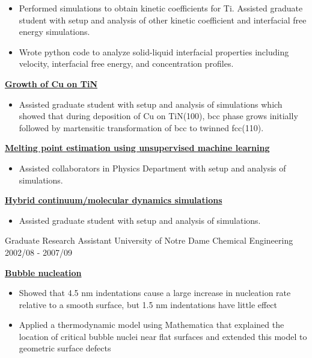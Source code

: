\begin{cventries}
{\begin{cvitems}
                \begin{itemize}
                \item {Performed simulations to obtain kinetic coefficients for Ti. Assisted graduate student with setup and analysis of other kinetic coefficient and interfacial free energy simulations.}
                \item {Wrote python code to analyze solid-liquid interfacial properties including velocity, interfacial free energy, and concentration profiles.}
                \end{itemize}
            \item {\textbf{\underline{Growth of Cu on TiN}}}
                \vspace{2pt}
                \begin{itemize}
                \item {Assisted graduate student with setup and analysis of simulations which showed that during deposition of Cu on TiN(100), bcc phase grows initially followed by martensitic transformation of bcc to twinned fcc(110).}
                \end{itemize}
            \item {\textbf{\underline{Melting point estimation using unsupervised machine learning}}}
                \vspace{2pt}
                \begin{itemize}
                \item {Assisted collaborators in Physics Department with setup and analysis of simulations.}
                \end{itemize}
            \item {\textbf{\underline{Hybrid continuum/molecular dynamics simulations}}}
                \vspace{2pt}
                \begin{itemize}
                \item {Assisted graduate student with setup and analysis of simulations.}
                \end{itemize}
        \end{cvitems}
    }

  \cventry
    {Graduate Research Assistant} %
    {University of Notre Dame} %
    {Chemical Engineering} %
    {2002/08 - 2007/09} %
    {
      \begin{cvitems} %
        \item {\textbf{\underline{Bubble nucleation}}}
            \begin{itemize}
                \item {Showed that 4.5 nm indentations cause a large increase in nucleation rate relative to a smooth surface, but 1.5 nm indentations have little effect}
                \item {Applied a thermodynamic model using Mathematica that explained the location of critical bubble nuclei near flat surfaces and extended this model to geometric surface defects}
            \end{itemize}
      \end{cvitems}
    }
    

\end{cventries}
